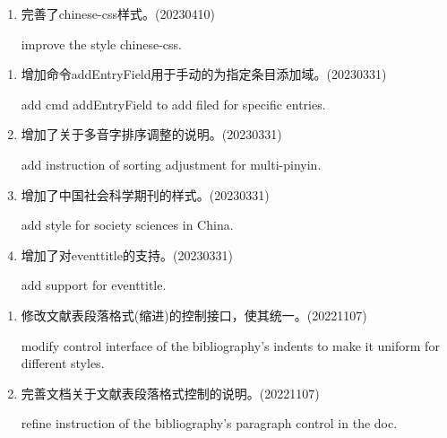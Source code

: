 

\label{up:latest}
\begin{enumerate}

\item 完善了chinese-css样式。(20230410)

improve the style chinese-css.

\end{enumerate}

\label{up:20230331}
\begin{enumerate}

\item 增加命令addEntryField用于手动的为指定条目添加域。(20230331)

add cmd addEntryField to add filed for specific entries.


\item 增加了关于多音字排序调整的说明。(20230331)

add instruction of sorting adjustment for multi-pinyin.


\item 增加了中国社会科学期刊的样式。(20230331)

add style for society sciences in China.

\item 增加了对eventtitle的支持。(20230331)

add support for eventtitle.

\end{enumerate}


\label{up:20221107}
\begin{enumerate}


\item 修改文献表段落格式(缩进)的控制接口，使其统一。(20221107)

modify control interface of the bibliography's indents to make it uniform for different styles.

\item 完善文档关于文献表段落格式控制的说明。(20221107)

refine instruction of the bibliography's paragraph control in the doc.

\end{enumerate}


